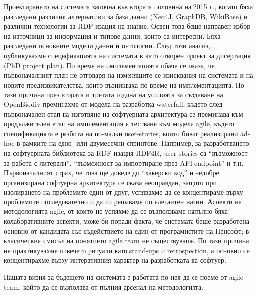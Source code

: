 Проектирането на системата започна във втората половина на 2015 г., когато бяха разгледани различни алтернативи за база данни (Neo4J, GraphDB, WikiBase) и различни технологии за RDF-изация на знание. Освен това беше направен избор на източници за информация и типове данни, които са интересни. Бяха разгледани основните модели данни и онтологии. След този анализ, публикувахме спецификацията на системата в \cite{senderov_open_2016} като отворен проект за дисертация (PhD project plan). По време на имплементацията обаче се оказа, че първоначалният план не отговаря на изменящите се изисквания на системата и на новите предизвикателства, които възникваха по време на имплементацията. По тази причина през втората и третата година на усилията за създаване на OpenBiodiv преминахме от модела на разработка waterfall, където след първоначален етап на изготвяне на софтуерната архитектура се преминава към продължителен етап на имплементация и тестване към модела agile, където спецификацията е разбита на по-малки user-stories, които биват реализирани ad-hoc в рамките на едно- или двумесечни спринтове. Например, за разработването на софтуерната библиотека за RDF-изация RDF4R, user-stories са ``възможност за работа с литерали'', ``възможност за импортиране през API endpoint'' и т.н. Първоначалният страх, че това ще доведе до ``хакерски код'' и недобре организирана софтуерна архитектура се оказа неоправдан, защото при изолирането на проблемите един от друг, успявахме да се концентираме върху проблемите последователно и да ги решаваме по елегантен начин. Аспекти на методологията agile, от които не успяхме да се възползваме напълно бяха колаборативните аспекти, може би поради факта, че системата беше разработена основно от кандидата със съдействието на един от програмистите на Пенсофт; в класическия смисъл на понятието agile team не съществуваше. По тази причина не практикувахме повечето ритуали като stand-ups и retrospection, а основно се концентирахме върху интеративния характер на разработката на софтуер.

Нашата визия за бъдещето на системата е работата по нея да се поеме от agile team, който да се възползва от пълния арсенал на методологията.